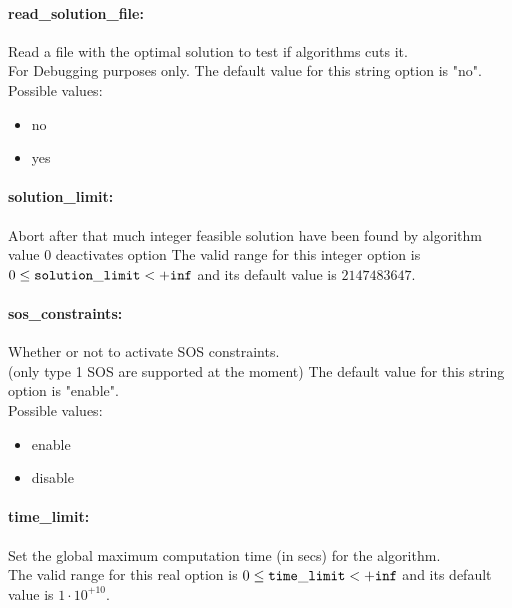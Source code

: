 \paragraph{read\_solution\_file:}\label{opt:read_solution_file} Read a file with the optimal solution to test if algorithms cuts it. \\
 For Debugging purposes only. The default value for this string option is "no".
\\ 
Possible values:
\begin{itemize}
   \item no
   \item yes
\end{itemize}

\paragraph{solution\_limit:}\label{opt:solution_limit} Abort after that much integer feasible solution have been found by algorithm \\
 value 0 deactivates option The valid range for this integer option is
$0 \le {\tt solution\_limit } <  {\tt +inf}$
and its default value is $2147483647$.


\paragraph{sos\_constraints:}\label{opt:sos_constraints} Whether or not to activate SOS constraints. \\
 (only type 1 SOS are supported at the moment) The default value for this string option is "enable".
\\ 
Possible values:
\begin{itemize}
   \item enable
   \item disable
\end{itemize}

\paragraph{time\_limit:}\label{opt:time_limit} Set the global maximum computation time (in secs) for the algorithm. \\
 The valid range for this real option is 
$0 \le {\tt time\_limit } <  {\tt +inf}$
and its default value is $1 \cdot 10^{+10}$.


